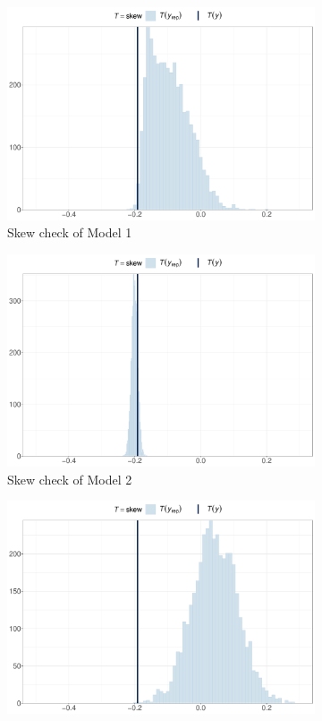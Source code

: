 \documentclass[a4paper]{article}   	%
\begin{document}
	\begin{figure}[!htp]
		\centering
		\begin{subfigure}[t]{0.45\textwidth}
			\includegraphics[width=\linewidth]{Images/skew_GSRNS_scale.pdf}
			\caption{Skew check of Model 1}
		\end{subfigure}
		\begin{subfigure}[t]{0.45\textwidth}
			\includegraphics[width=\linewidth]{Images/skew_GSRand_scale.pdf}
			\caption{Skew check of Model 2}
		\end{subfigure}
		\begin{subfigure}[t]{0.45\textwidth}
			\includegraphics[width=\linewidth]{Images/skew_STRNS_scale.pdf}

\end{subfigure}
\end{figure}
\end{document}
